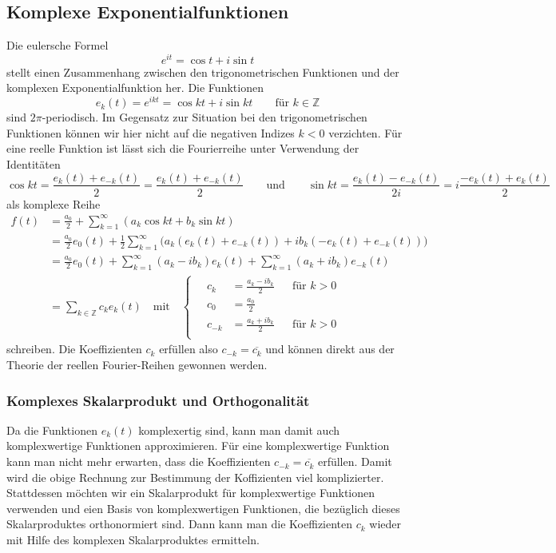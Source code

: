\subsection{Komplexe Exponentialfunktionen}
Die eulersche Formel
\[
e^{it} = \cos t + i\sin t
\]
stellt einen Zusammenhang zwischen den trigonometrischen Funktionen
und der komplexen Exponentialfunktion her.
Die Funktionen
\[
e_k(t) = e^{ikt} = \cos kt + i\sin kt\qquad\text{für $k\in\mathbb{Z}$}
\]
sind $2\pi$-periodisch.
Im Gegensatz zur Situation bei den trigonometrischen Funktionen können
wir hier nicht auf die negativen Indizes $k<0$ verzichten.
Für eine reelle Funktion ist lässt sich die Fourierreihe unter Verwendung
der Identitäten
\[
\cos kt
=
\frac{e_k(t) + e_{-k}(t)}{2}
=
\frac{e_k(t) + e_{-k}(t)}2
\qquad\text{und}\qquad
\sin kt
=
\frac{e_k(t) - e_{-k}(t)}{2i}
=
i\frac{-e_{k}(t)+e_k(t)}2
\]
als komplexe Reihe 
\begin{align*}
f(t)
&=
\frac{a_0}2
+\sum_{k=1}^\infty (a_k\cos kt + b_k \sin kt)
\\
&=
\frac{a_0}2 e_0(t)
+
\frac12
\sum_{k=1}^\infty
\bigl(
a_k(e_k(t)+e_{-k}(t))
+
ib_k(-e_k(t)+e_{-k}(t))
\bigr)
\\
&=
\frac{a_0}2e_0(t)
+
\sum_{k=1}^\infty (a_k-ib_k)e_k(t)
+
\sum_{k=1}^\infty (a_k+ib_k)e_{-k}(t)
\\
&=\sum_{k\in\mathbb{Z}} c_ke_k(t)
\quad\text{mit}\quad
\left\{\quad
\begin{aligned}
c_k    &= \frac{a_k-ib_k}2&&\text{für $k>0$}\\
c_0    &= \frac{a_0}2     &&                \\
c_{-k} &= \frac{a_k+ib_k}2&&\text{für $k>0$}\\
\end{aligned}
\right.
\end{align*}
schreiben.
Die Koeffizienten $c_k$ erfüllen also $c_{-k}=\overline{c_k}$
und können direkt aus der Theorie der reellen Fourier-Reihen
gewonnen werden.

%
%
\subsubsection{Komplexes Skalarprodukt und Orthogonalität}
Da die Funktionen $e_k(t)$ komplexertig sind, kann man damit
auch komplexwertige Funktionen approximieren. 
Für eine komplexwertige Funktion kann man nicht mehr erwarten, dass die
Koeffizienten $c_{-k}=\overline{c_k}$ erfüllen.
Damit wird die obige Rechnung zur Bestimmung der Koffizienten
viel komplizierter.
Stattdessen möchten wir ein Skalarprodukt für komplexwertige Funktionen
verwenden und eien Basis von komplexwertigen Funktionen, die 
bezüglich dieses Skalarproduktes orthonormiert sind.
Dann kann man die Koeffizienten $c_k$ wieder mit Hilfe des komplexen
Skalarproduktes ermitteln.

